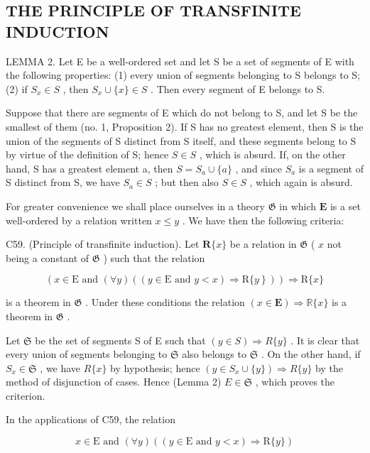 \subsection{THE PRINCIPLE OF TRANSFINITE INDUCTION}

LEMMA 2. Let E be a well-ordered set and let S be a set of segments of E with the following properties: (1) every union of segments belonging to S belongs to S; (2) if \(S_{x} \in S\) , then \(S_{x} \cup \{x\} \in S\) . Then every segment of E belongs to S.

Suppose that there are segments of E which do not belong to S, and let S be the smallest of them (no. 1, Proposition 2). If S has no greatest element, then S is the union of the segments of S distinct from S itself, and these segments belong to S by virtue of the definition of S; hence \(S \in S\) , which is absurd. If, on the other hand, S has a greatest element a, then \(S = S_{a} \cup \{a\}\) , and since \(S_{a}\) is a segment of S distinct from S, we have \(S_{a} \in S\) ; but then also \(S \in S\) , which again is absurd.

For greater convenience we shall place ourselves in a theory \(\mathfrak{G}\) in which \(\mathbf{E}\) is a set well-ordered by a relation written \(x \leqslant y\) . We have then the following criteria:

C59. (Principle of transfinite induction). Let \(\mathbf{R}\{x\}\) be a relation in \(\mathfrak{G}\) ( \(x\) not being a constant of \(\mathfrak{G}\) ) such that the relation

\[
(x \in \mathrm{E} \text { and } (\forall y) ((y \in \mathrm{E} \text { and } y <   x) \Longrightarrow \mathrm{R} \{\left. y \right\})) \Longrightarrow \mathrm{R} \{x \}
\]

is a theorem in \(\mathfrak{G}\) . Under these conditions the relation \((x\in \mathbf{E})\Rightarrow \mathbb{R}\{x\}\) is a theorem in \(\mathfrak{G}\) .

Let \(\mathfrak{S}\) be the set of segments S of E such that \((y\in S)\Longrightarrow R\{y\}\) . It is clear that every union of segments belonging to \(\mathfrak{S}\) also belongs to \(\mathfrak{S}\) . On the other hand, if \(S_x\in \mathfrak{S}\) , we have \(R\{x\}\) by hypothesis; hence \((y\in S_x\cup \{y\})\Longrightarrow R\{y\}\) by the method of disjunction of cases. Hence (Lemma 2) \(E\in \mathfrak{S}\) , which proves the criterion.

In the applications of C59, the relation

\[
x \in \mathrm{E} \text {   and   } (\forall y) ((y \in \mathrm{E} \text {   and   } y <   x) \Longrightarrow \mathrm{R} \{y \})
\]


